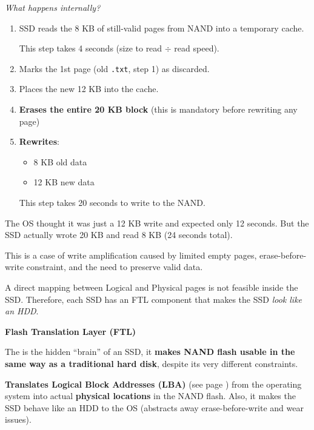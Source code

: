 \begin{examplebox}
\begin{enumerate}
        \newpage

        \emph{What happens internally?}
        \begin{enumerate}
            \item SSD reads the 8 KB of still-valid pages from NAND into a temporary cache.

            This step takes 4 seconds (size to read $\div$ read speed).
            \item Marks the 1st page (old \texttt{.txt}, step 1) as discarded.
            \item Places the new 12 KB into the cache.
            \item \textbf{Erases the entire 20 KB block} (this is mandatory before rewriting any page)
            \item \textbf{Rewrites}:
            \begin{itemize}
                \item 8 KB old data
                \item 12 KB new data
            \end{itemize}
            This step takes 20 seconds to write to the NAND.
        \end{enumerate}
    \end{enumerate}
    The OS thought it was just a 12 KB write and expected only 12 seconds. But the SSD actually wrote 20 KB and read 8 KB (24 seconds total).

    This is a case of write amplification caused by limited empty pages, erase-before-write constraint, and the need to preserve valid data.
\end{examplebox}

\noindent
A direct mapping between Logical and Physical pages is not feasible inside the SSD. Therefore, each SSD has an FTL component that makes the SSD \emph{look like an HDD}.

\highspace
\begin{flushleft}
    \textcolor{Red2}{ \textbf{Flash Translation Layer (FTL)}}
\end{flushleft}
The  is the hidden ``brain'' of an SSD, it \textbf{makes NAND flash usable in the same way as a traditional hard disk}, despite its very different constraints.

\highspace
\textbf{Translates Logical Block Addresses (LBA)} (see page \pageref{Write amplification (WA)}) from the operating system into actual \textbf{physical locations} in the NAND flash. Also, it makes the SSD behave like an HDD to the OS (abstracts away erase-before-write and wear issues).

